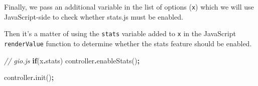 \documentclass[
]{krantz}
\makeatletter
\newenvironment{Shaded}{\begin{snugshade}}{\end{snugshade}}
\newcommand{\AttributeTok}[1]{\textcolor[rgb]{0.61,0.61,0.61}{#1}}
\newcommand{\CommentTok}[1]{\textcolor[rgb]{0.37,0.37,0.37}{\textit{#1}}}
\newcommand{\ControlFlowTok}[1]{\textcolor[rgb]{0.27,0.27,0.27}{\textbf{#1}}}
\newcommand{\DataTypeTok}[1]{\textcolor[rgb]{0.27,0.27,0.27}{#1}}
\newcommand{\FunctionTok}[1]{\textcolor[rgb]{0,0,0}{#1}}
\newcommand{\KeywordTok}[1]{\textcolor[rgb]{0.27,0.27,0.27}{\textbf{#1}}}
\newcommand{\NormalTok}[1]{#1}
\newcommand{\OperatorTok}[1]{\textcolor[rgb]{0.43,0.43,0.43}{\textbf{#1}}}
\newcommand{\OtherTok}[1]{\textcolor[rgb]{0.37,0.37,0.37}{#1}}
\newcommand{\StringTok}[1]{\textcolor[rgb]{0.5,0.5,0.5}{#1}}
\newenvironment{kframe}{%
\medskip{}
\setlength{\fboxsep}{.8em}
 \def\at@end@of@kframe{}%
 \ifinner\ifhmode%
  \def\at@end@of@kframe{\end{minipage}}%
  \begin{minipage}{\columnwidth}%
 \fi\fi%
 \def\FrameCommand##1{\hskip\@totalleftmargin \hskip-\fboxsep
 \colorbox{shadecolor}{##1}\hskip-\fboxsep
     \hskip-\linewidth \hskip-\@totalleftmargin \hskip\columnwidth}%
 \MakeFramed {\advance\hsize-\width
   \@totalleftmargin\z@ \linewidth\hsize
   \@setminipage}}%
 {\par\unskip\endMakeFramed%
 \at@end@of@kframe}
\renewenvironment{Shaded}{\begin{kframe}}{\end{kframe}}
\makeatother
\begin{document}
Finally, we pass an additional variable in the list of options (\texttt{x}) which we will use JavaScript-side to check whether stats.js must be enabled.

\begin{Shaded}
\end{Shaded}

Then it's a matter of using the \texttt{stats} variable added to \texttt{x} in the JavaScript \texttt{renderValue} function to determine whether the stats feature should be enabled.

\begin{Shaded}
\begin{Highlighting}[]
\CommentTok{// gio.js}
\ControlFlowTok{if}\NormalTok{(x}\OperatorTok{.}\AttributeTok{stats}\NormalTok{)}
\NormalTok{  controller}\OperatorTok{.}\FunctionTok{enableStats}\NormalTok{()}\OperatorTok{;}

\NormalTok{controller}\OperatorTok{.}\FunctionTok{init}\NormalTok{()}\OperatorTok{;}
\end{Highlighting}
\end{Shaded}
\end{document}
